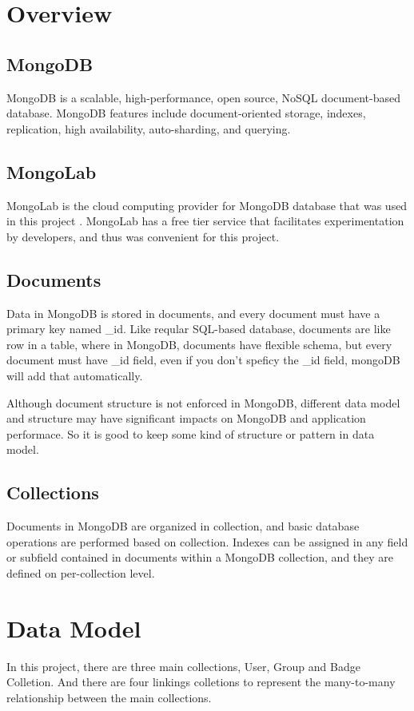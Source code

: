 
\section{Overview}
\subsection{MongoDB}
 MongoDB is a scalable, high-performance, open source, NoSQL document-based database. MongoDB features include document-oriented storage, indexes, replication, high availability, auto-sharding, and querying.  \cite{mongodb}

\subsection{MongoLab}
MongoLab is the cloud computing provider for MongoDB database that was used in this project \cite{mongolab}.  MongoLab has a free tier service that facilitates experimentation by developers, and thus was convenient for this project. 

\subsection{Documents}
Data in MongoDB is stored in documents, and every document must have a primary key named {\_id}. Like reqular SQL-based database, documents are like row in a table, where in MongoDB, documents have flexible schema, but every document must have {\_id} field, even if you don't speficy the {\_id} field, mongoDB will add that automatically.  \cite{mongodb}

Although document structure is not enforced in MongoDB, different data model and structure may have significant impacts on MongoDB and application performace. So it is good to keep some kind of structure or pattern in data model.  

\subsection{Collections}
Documents in MongoDB are organized in collection, and basic database operations are performed based on collection. Indexes can be assigned in any field or subfield contained in documents within a MongoDB collection, and they are defined on per-collection level.  \cite{mongodb}   

\section{Data Model}
In this project, there are three main collections, User, Group and Badge Colletion. And there are four linkings colletions to represent the many-to-many relationship between the main collections.

